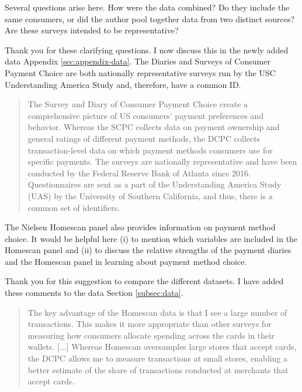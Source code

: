 \documentclass[main.tex]{subfiles}
\begin{document}
\begin{refsection}
\begin{figure}[ht!]
    \end{figure}

\begin{refcomment}
Several questions arise here.
How were the data combined?
Do they include the same consumers, or did the author pool together data from two distinct sources?
Are these surveys intended to be representative?
\end{refcomment}

Thank you for these clarifying questions.
I now discuss this in the newly added data Appendix \ref{sec:appendix-data}.
The Diaries and Surveys of Consumer Payment Choice are both nationally representative surveys run by the USC Understanding America Study and, therefore, have a common ID.
\begin{quotation}
    The Survey and Diary of Consumer Payment Choice create a comprehensive picture of US consumers' payment preferences and behavior.
Whereas the SCPC collects data on payment ownership and general ratings of different payment methods, the DCPC collects transaction-level data on which payment methods consumers use for specific payments.
The surveys are nationally representative and have been conducted by the Federal Reserve Bank of Atlanta since 2016.
Questionnaires are sent as a part of the Understanding America Study (UAS) by the University of Southern California, and thus, there is a common set of identifiers.
\end{quotation}

\begin{refcommentnoclear}
The Nielsen Homescan panel also provides information on payment method choice.
It would be helpful here (i) to mention which variables are included in the Homescan panel and (ii) to discuss the relative strengths of the payment diaries and the Homescan panel in learning about payment method choice.
\end{refcommentnoclear}

Thank you for this suggestion to compare the different datasets.
I have added these comments to the data Section \ref{subsec:data}.
\begin{quotation}
    The key advantage of the Homescan data is that I see a large number of transactions. 
    This makes it more appropriate than other surveys for measuring how consumers allocate spending across the cards in their wallets.
    [...]
    Whereas Homescan oversamples large stores that accept cards, the DCPC allows me to measure transactions at small stores, enabling a better estimate of the share of transactions conducted at merchants that accept cards.
\end{quotation}


\end{refsection}
\end{document}
